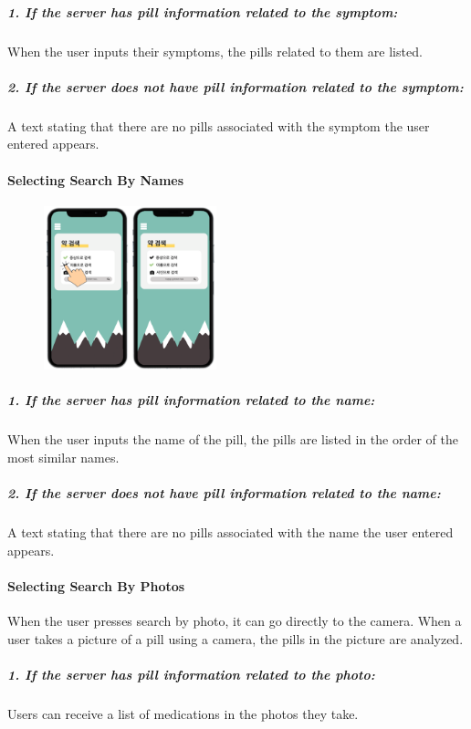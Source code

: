 \documentclass[conference]{IEEEtran}
\begin{document}
\subparagraph{
1. If the server has pill information related to the symptom: }
When the user inputs their symptoms, the pills related to them are listed. \\

\subparagraph{2. If the server does not have pill information related to the symptom: }
A text stating that there are no pills associated with the symptom the user entered appears.\\

\paragraph{Selecting Search By Names}

\begin{figure}[h!]
\centering
\includegraphics[width=5cm]{final_image_folder/click_search_name.png}
\caption{}
\label{fig:map}
\end{figure}

\subparagraph{
1. If the server has pill information related to the name: }
When the user inputs the name of the pill, the pills are listed in the order of the most similar names.\\

\subparagraph{2. If the server does not have pill information related to the name: }
A text stating that there are no pills associated with the name the user entered appears.\\

\paragraph{Selecting Search By Photos}
When the user presses search by photo, it can go directly to the camera. When a user takes a picture of a pill using a camera, the pills in the picture are analyzed.\\

\subparagraph{1. If the server has pill information related to the photo:}
Users can receive a list of medications in the photos they take.\\
\end{document}
